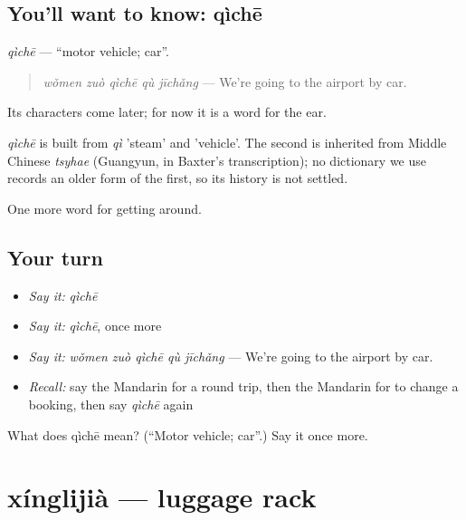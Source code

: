 \subsection*{You'll want to know: qìchē}
\emph{qìchē} — \textquotedblleft{}motor vehicle; car\textquotedblright{}.

\begin{quote}
\emph{wǒmen zuò qìchē qù jīchǎng} — We're going to the airport by car.
\end{quote}

Its characters come later; for now it is a word for the ear.

\begin{cousinweb}
\emph{qìchē} is built from \emph{qì} 'steam' and  'vehicle'. The second is inherited from Middle Chinese \emph{tsyhae} (Guangyun, in Baxter's transcription); no dictionary we use records an older form of the first, so its history is not settled.
\end{cousinweb}

\begin{grammarlens}[title={What you've built}]
One more word for getting around.
\end{grammarlens}

\subsection*{Your turn}
\begin{itemize}
\raggedright
  \item \emph{Say it:} \emph{qìchē}
  \item \emph{Say it:} \emph{qìchē}, once more
  \item \emph{Say it:} \emph{wǒmen zuò qìchē qù jīchǎng} — We're going to the airport by car.
  \item \emph{Recall:} say the Mandarin for a round trip, then the Mandarin for to change a booking, then say \emph{qìchē} again
\end{itemize}

\begin{tcolorbox}[breakable,colback=teal!4,colframe=teal!35!black,title={Before you move on}]
What does qìchē mean? (\textquotedblleft{}Motor vehicle; car\textquotedblright{}.) Say it once more.
\end{tcolorbox}
\section[xínglijià]{xínglijià — luggage rack}

